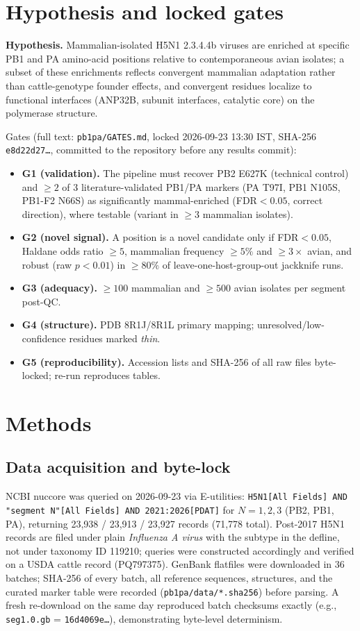 \documentclass[11pt]{article}
\begin{document}
\section{Hypothesis and locked gates}
\textbf{Hypothesis.} Mammalian-isolated H5N1 2.3.4.4b viruses are enriched at specific PB1 and PA amino-acid positions relative to contemporaneous avian isolates; a subset of these enrichments reflects convergent mammalian adaptation rather than cattle-genotype founder effects, and convergent residues localize to functional interfaces (ANP32B, subunit interfaces, catalytic core) on the polymerase structure.

Gates (full text: \texttt{pb1pa/GATES.md}, locked 2026-09-23 13:30 IST, SHA-256 \texttt{e8d22d27\ldots}, committed to the repository before any results commit):
\begin{itemize}
\item \textbf{G1 (validation).} The pipeline must recover PB2 E627K (technical control) and $\geq2$ of 3 literature-validated PB1/PA markers (PA T97I, PB1 N105S, PB1-F2 N66S) as significantly mammal-enriched (FDR$<0.05$, correct direction), where testable (variant in $\geq3$ mammalian isolates).
\item \textbf{G2 (novel signal).} A position is a novel candidate only if FDR$<0.05$, Haldane odds ratio $\geq5$, mammalian frequency $\geq5\%$ and $\geq3\times$ avian, and robust (raw $p<0.01$) in $\geq80\%$ of leave-one-host-group-out jackknife runs.
\item \textbf{G3 (adequacy).} $\geq100$ mammalian and $\geq500$ avian isolates per segment post-QC.
\item \textbf{G4 (structure).} PDB 8R1J/8R1L primary mapping; unresolved/low-confidence residues marked \emph{thin}.
\item \textbf{G5 (reproducibility).} Accession lists and SHA-256 of all raw files byte-locked; re-run reproduces tables.
\end{itemize}

\section{Methods}
\subsection{Data acquisition and byte-lock}
NCBI nuccore was queried on 2026-09-23 via E-utilities: \texttt{H5N1[All Fields] AND "segment N"[All Fields] AND 2021:2026[PDAT]} for $N=1,2,3$ (PB2, PB1, PA), returning 23,938 / 23,913 / 23,927 records (71,778 total). Post-2017 H5N1 records are filed under plain \emph{Influenza A virus} with the subtype in the defline, not under taxonomy ID 119210; queries were constructed accordingly and verified on a USDA cattle record (PQ797375). GenBank flatfiles were downloaded in 36 batches; SHA-256 of every batch, all reference sequences, structures, and the curated marker table were recorded (\texttt{pb1pa/data/*.sha256}) before parsing. A fresh re-download on the same day reproduced batch checksums exactly (e.g., \texttt{seg1.0.gb} = \texttt{16d4069e\ldots}), demonstrating byte-level determinism.
\end{document}
